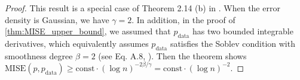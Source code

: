 \MISELowerBound*
\begin{proof}
    This result is a special case of Theorem 2.14 (b) in \citep{Meister2009}. When the error density is Gaussian, we have $\gamma = 2$. In addition, in the proof of \cref{thm:MISE_upper_bound}, we assumed that $p_\text{data}$ has two bounded integrable derivatives, which equivalently assumes $p_\text{data}$ satisfies the Soblev condition with smoothness degree $\beta = 2$ (see Eq. A.8,  \citealt{Meister2009}). Then the theorem shows $\mathrm{MISE}(\hat{p}, p_\textrm{data}) \geq \textrm{const} \cdot (\log n)^{-2\beta / \gamma} = \textrm{const} \cdot (\log n)^{-2}$. 
\end{proof}





